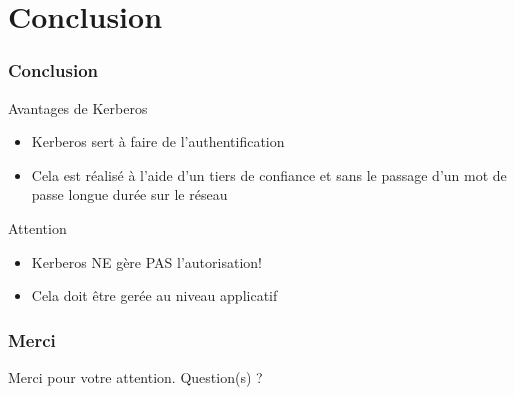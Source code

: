 \documentclass[svgnames]{beamer}
\begin{document}
\section*{Conclusion}
\begin{frame}
  \frametitle{Conclusion}
  
  \begin{exampleblock}{Avantages de Kerberos}
  \begin{itemize}
   \item Kerberos sert à faire de l'authentification
   \item Cela est réalisé à l'aide d'un tiers de confiance et sans le passage d'un mot de passe longue durée sur le réseau
     \end{itemize}
   \end{exampleblock}


  
 \begin{alertblock}{Attention}
   \begin{itemize}
    \item Kerberos NE gère PAS l'autorisation!
    \item Cela doit être gerée au niveau applicatif
   \end{itemize}
  \end{alertblock}

\end{frame}


\begin{frame}
  \frametitle{Merci}
  \begin{center}
    Merci pour votre attention. Question(s) ?
  \end{center}
\end{frame}
\end{document}
